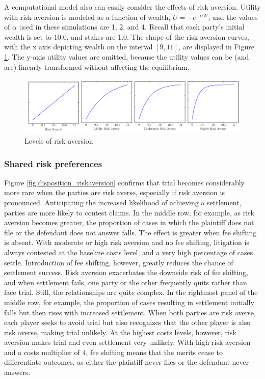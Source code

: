 \documentclass{article}
\begin{document}
A computational model also can easily consider the effects of risk aversion. Utility with risk aversion is modeled as a function of wealth, $U=-e^{-\alpha W}$, and the values of $\alpha$ used in these simulations are 1, 2, and 4. Recall that each party's initial wealth is set to 10.0, and stakes are 1.0. The shape of the risk aversion curves, with the x axis depicting wealth on the interval $[9, 11]$,  are displayed in Figure \ref{fig:riskaversion}. The y-axis utility values are omitted, because the utility values can be (and are) linearly transformed without affecting the equilibrium. 

\begin{figure}[h!]
\centering
\includegraphics[scale=0.40, trim={0in 0in 0in 0in}, clip]{../Figures/risk aversion.pdf}
\caption{Levels of risk aversion}
\label{fig:riskaversion}
\end{figure}

\subsubsection{Shared risk preferences}

Figure \ref{fig:disposition_riskaversion} confirms that trial becomes considerably more rare when the parties are risk averse, especially if risk aversion is pronounced. Anticipating the increased likelihood of achieving a settlement, parties are more likely to contest claims. In the middle row, for example, as risk aversion becomes greater, the proportion of cases in which the plaintiff does not file or the defendant does not answer falls. The effect is greater when fee shifting is absent. With moderate or high risk aversion and no fee shifting, litigation is always contested at the baseline costs level, and a very high percentage of cases settle. Introduction of fee shifting, however, greatly reduces the chance of settlement success. Risk aversion exacerbates the downside risk of fee shifting, and when settlement fails, one party or the other frequently quits rather than face trial. Still, the relationships are quite complex. In the rightmost panel of the middle row, for example, the proportion of cases resulting in settlement initially falls but then rises with increased settlement. When both parties are risk averse, each player seeks to avoid trial but also recognizes that the other player is also risk averse, making trial unlikely. At the highest costs levels, however, risk aversion makes trial and even settlement very unlikely. With high risk aversion and a costs multiplier of 4, fee shifting means that the merits cease to differentiate outcomes, as either the plaintiff never files or the defendant never answers.
\end{document}
